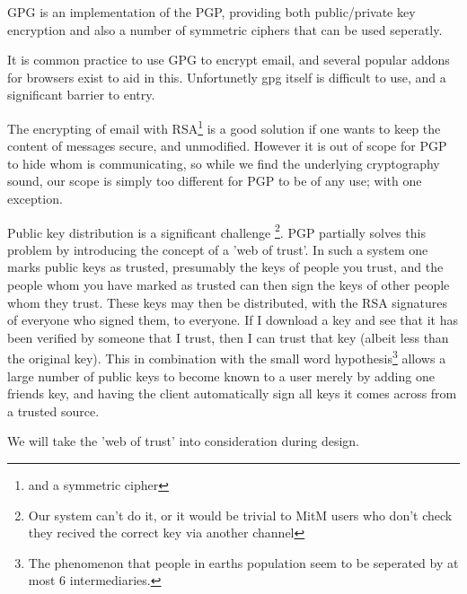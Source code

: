 GPG is an implementation of the PGP\cite{rfc4880}, providing both public/private
key encryption and also a number of symmetric ciphers that can be used
seperatly.

It is common practice to use GPG to encrypt email, and several popular addons
for browsers exist to aid in this\cite{gpgaddon}. Unfortunetly gpg itself is
difficult to use\cite{greenwaldAnnoying}, and a significant barrier to entry.

The encrypting of email with RSA\footnote{and a symmetric cipher} is a good
solution if one wants to keep the content of messages secure, and unmodified.
However it is out of scope for PGP to hide whom is communicating, so while we
find the underlying cryptography sound, our scope is simply too different for
PGP to be of any use; with one exception.

Public key distribution is a significant challenge \footnote{Our system can't do
it, or it would be trivial to MitM users who don't check they recived the
correct key via another channel}. PGP partially solves this problem by
introducing the concept of a 'web of trust'. In such a system one marks public
keys as trusted, presumably the keys of people you trust, and the people whom
you have marked as trusted can then sign the keys of other people whom they
trust. These keys may then be distributed, with the RSA signatures of everyone
who signed them, to everyone. If I download a key and see that it has been
verified by someone that I trust, then I can trust that key (albeit less than
the original key). This in combination with the small word hypothesis\footnote{
The phenomenon that people in earths population seem to be seperated by at most
6 intermediaries.}\cite{sixdegrees} allows a large number of public keys to
become known to a user merely by adding one friends key, and having the client
automatically sign all keys it comes across from a trusted source.

We will take the 'web of trust' into consideration during design.
